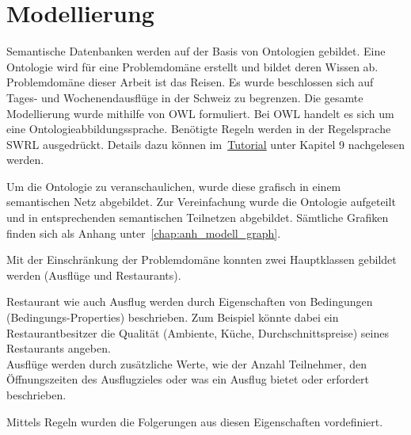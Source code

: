 \section{Modellierung}
\label{sec:loesung_modellierung}
Semantische Datenbanken werden auf der Basis von Ontologien gebildet. Eine Ontologie wird für eine Problemdomäne erstellt und bildet deren Wissen ab. Problemdomäne dieser Arbeit ist das Reisen. Es wurde beschlossen sich auf Tages- und Wochenendausflüge in der Schweiz zu begrenzen. Die gesamte Modellierung wurde mithilfe von OWL formuliert. Bei OWL handelt es sich um eine Ontologieabbildungssprache. Benötigte Regeln werden in der Regelsprache SWRL ausgedrückt. Details dazu können im~\hyperref[sec:anhang:tutorial_dokument]{Tutorial} unter Kapitel 9 nachgelesen werden.

Um die Ontologie zu veranschaulichen, wurde diese grafisch in einem semantischen Netz abgebildet. Zur Vereinfachung wurde die Ontologie aufgeteilt und in entsprechenden semantischen Teilnetzen abgebildet. Sämtliche Grafiken finden sich als Anhang unter~\ref{chap:anh_modell_graph}.


Mit der Einschränkung der Problemdomäne konnten zwei Hauptklassen gebildet werden (Ausflüge und Restaurants).

Restaurant wie auch Ausflug werden durch Eigenschaften von Bedingungen (Bedingungs-Properties) beschrieben. Zum Beispiel könnte dabei ein Restaurantbesitzer die Qualität (Ambiente, Küche, Durchschnittspreise) seines Restaurants angeben.\\
Ausflüge werden durch zusätzliche Werte, wie der Anzahl Teilnehmer, den Öffnungszeiten des Ausflugzieles oder was ein Ausflug bietet oder erfordert beschrieben.

Mittels Regeln wurden die Folgerungen aus diesen Eigenschaften vordefiniert.

